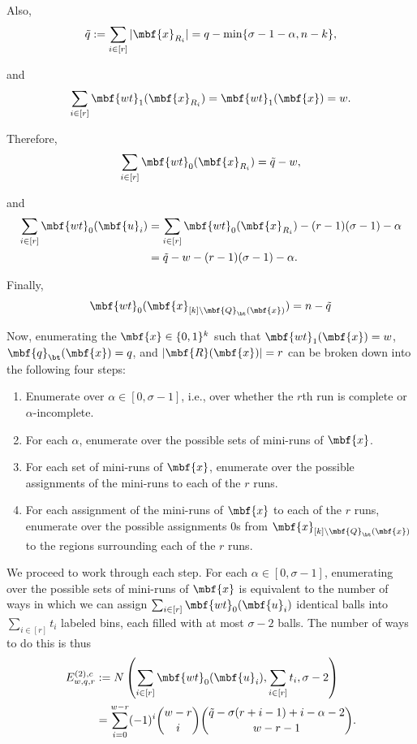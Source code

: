 Also,
\begin{equation*}
    \tilde{q} := \sum_{i\in[r]}|\mbf{x}_{R_i}| = q - \min\{\sigma - 1 - \alpha, n - k\},
\end{equation*}

and
\begin{equation*}
    \sum_{i\in[r]}\mbf{wt}_1(\mbf{x}_{R_i}) = \mbf{wt}_1(\mbf{x}) = w.
\end{equation*}

Therefore,
\begin{equation*}
    \sum_{i\in[r]}\mbf{wt}_0(\mbf{x}_{R_i}) = \tilde{q} - w,
\end{equation*}

and
\begin{align*}
    \sum_{i \in [r]} \mbf{wt}_0(\mbf{u}_i) &= \sum_{i \in [r]} \mbf{wt}_0(\mbf{x}_{R_i}) - (r - 1)(\sigma - 1) - \alpha\\
    &=\tilde{q} - w - (r - 1)(\sigma - 1) - \alpha.
\end{align*}

Finally,$$\mbf{wt}_0(\mbf{x}_{[k]\setminus \mbf{Q}_{\bt}(\mbf{x})}) = n-\tilde{q}$$

Now, enumerating the $\mbf{x} \in \{0,1\}^{k}$ such that $\mbf{wt}_1(\mbf{x}) = w$, $\mbf{q}_{\bt}(\mbf{x}) = q$, and $|\mbf{R}(\mbf{x})| = r$ can be broken down into the following four steps:
\renewcommand\labelenumi{(\theenumi)}
\begin{enumerate}
\item Enumerate over $\alpha \in [0, \sigma - 1]$, i.e., over whether the $r$th run is complete or $\alpha$-incomplete.
\item For each $\alpha$, enumerate over the possible sets of mini-runs of $\mbf{x}$.
\item For each set of mini-runs of $\mbf{x}$, enumerate over the possible assignments of the mini-runs to each of the $r$ runs.
\item For each assignment of the mini-runs of $\mbf{x}$ to each of the $r$ runs, enumerate over the possible assignments $0$s from $\mbf{x}_{[k]\setminus \mbf{Q}_{\bt}(\mbf{x})}$ to the regions surrounding each of the $r$ runs.
\end{enumerate}

We proceed to work through each step. For each $\alpha \in [0, \sigma - 1]$, enumerating over the possible sets of mini-runs of $\mbf{x}$ is equivalent to the number of ways in which we can assign $\sum_{i\in[r]}\mbf{wt}_0(\mbf{u}_i)$ identical balls into $\sum_{i\in[r]}t_i$ labeled bins, each filled with at most $\sigma-2$ balls. The number of ways to do this is thus
\begin{align*}
E_{w, q, r}^{(2), c}  &:= N\left( \sum_{i\in[r]} \mbf{wt}_0(\mbf{u}_i), \sum_{i\in[r]}t_i, \sigma - 2 \right) \\
&= \sum_{i = 0}^{w - r} (-1)^i {w - r \choose i} {\tilde{q} - \sigma(r + i - 1) + i - \alpha - 2 \choose w - r - 1}.
\end{align*}


